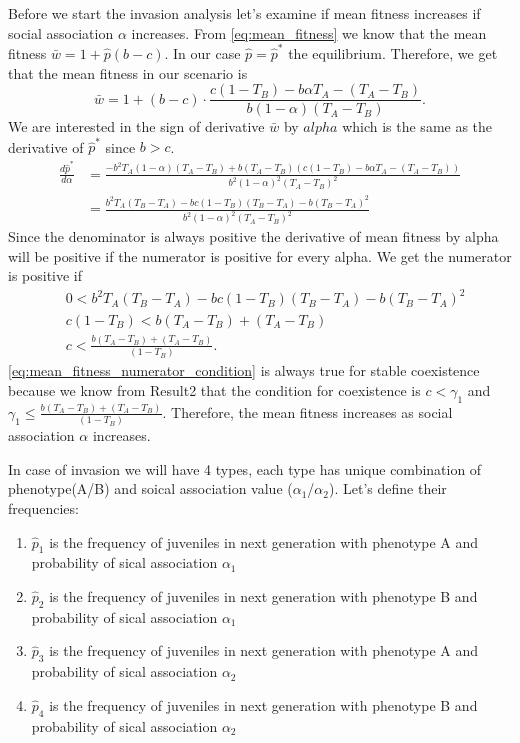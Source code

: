\documentclass[12pt]{extarticle}
\begin{document}
{Before we start the invasion analysis let's examine if mean fitness increases if social association $\alpha$ increases. 
From \autoref{eq:mean_fitness} we know that the mean fitness $\bar{w} = 1 + \hat{p}(b-c)$. In our case $\hat{p} = \hat{p}^*$ the equilibrium.
Therefore, we get that the mean fitness in our scenario is
\begin{equation} \label{eq:mean_fitness_stable_coexistence}
  \bar{w} = 1 + (b-c)\cdot \frac{c(1-T_B) - b \alpha T_A - (T_A-T_B)}{b (1-\alpha) (T_A-T_B)}.
\end{equation} 
We are interested in the sign of derivative $\bar{w}$ by $alpha$ which is the same as the derivative of $\hat{p}^*$ since $b>c$.
\begin{equation} \label{eq:mean_fitness_stable_coexistence_derivative}
  \begin{aligned}
  \frac{d\hat{p}^*}{d\alpha} & =\frac{-b^2T_A (1-\alpha) (T_A-T_B) + b(T_A-T_B)(c(1-T_B) - b \alpha T_A - (T_A-T_B))}{b^2 (1-\alpha)^2 (T_A-T_B)^2} \\
  &= \frac{b^2T_A(T_B-T_A)-bc(1-T_B)(T_B-T_A) - b(T_B-T_A)^2}{b^2 (1-\alpha)^2 (T_A-T_B)^2}
  \end{aligned}
\end{equation} 
Since the denominator is always positive the derivative of mean fitness by alpha will be positive if the numerator is positive for every alpha.
We get the numerator is positive if
\begin{equation} \label{eq:mean_fitness_numerator_condition}
  \begin{aligned}
  &  0 < b^2T_A(T_B-T_A)-bc(1-T_B)(T_B-T_A) - b(T_B-T_A)^2  \\
  & c(1-T_B) < b(T_A-T_B) + (T_A-T_B)  \\
  & c < \frac{b(T_A-T_B) + (T_A-T_B)}{(1-T_B)}.
  \end{aligned}
\end{equation} 
\autoref{eq:mean_fitness_numerator_condition} is always true for stable coexistence because we know from Result2 
that the condition for coexistence is $c<\gamma_1$ and $ \gamma_1 \leq \frac{b(T_A-T_B) + (T_A-T_B)}{(1-T_B)}$. 
Therefore, the mean fitness increases as social association $\alpha$ increases.

In case of invasion we will have 4 types, each type has unique combination of phenotype(A/B) and soical association value ($\alpha_1$/$\alpha_2$).
Let's define their frequencies:
\begin{enumerate}
  \item $\hat{p}_1$ is the frequency of juveniles in next generation with phenotype A and probability of sical association $\alpha_1$
  \item $\hat{p}_2$ is the frequency of juveniles in next generation with phenotype B and probability of sical association $\alpha_1$
  \item $\hat{p}_3$ is the frequency of juveniles in next generation with phenotype A and probability of sical association $\alpha_2$
  \item $\hat{p}_4$ is the frequency of juveniles in next generation with phenotype B and probability of sical association $\alpha_2$
\end{enumerate}

}
\end{document}
